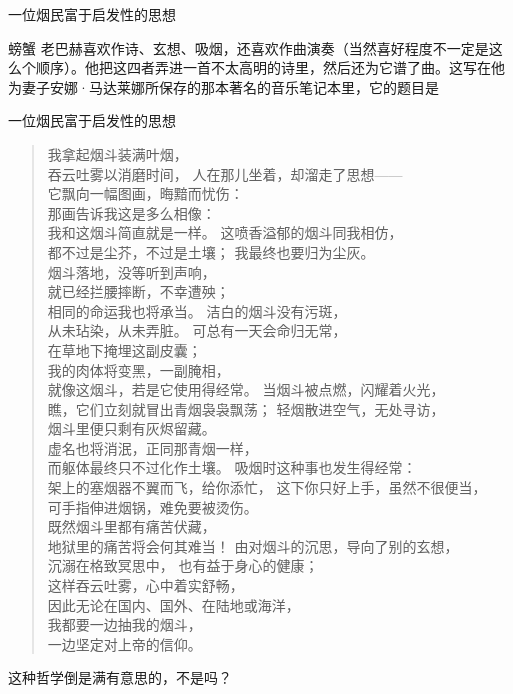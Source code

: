 \begin{dialog}{一位烟民富于启发性的思想}
\begin{dialogue}
\item[螃蟹]老巴赫喜欢作诗、玄想、吸烟，还喜欢作曲演奏（当然喜好程度不一定是这么个顺序）。他把这四者弄进一首不太高明的诗里，然后还为它谱了曲。这写在他为妻子安娜·马达莱娜所保存的那本著名的音乐笔记本里，它的题目是
\begin{center}\kaishu\large
一位烟民富于启发性的思想
\end{center}
\nopagebreak
\begin{verse}
我拿起烟斗装满叶烟，\\
吞云吐雾以消磨时间，
人在那儿坐着，却溜走了思想——\\
它飘向一幅图画，晦黯而忧伤：\\[1]
那画告诉我这是多么相像：\\[1]
我和这烟斗简直就是一样。
\medskip
这喷香溢郁的烟斗同我相仿，\\
都不过是尘芥，不过是土壤；
我最终也要归为尘灰。\\
烟斗落地，没等听到声响，\\[1]
就已经拦腰摔断，不幸遭殃；\\[1]
相同的命运我也将承当。
\medskip
洁白的烟斗没有污斑，\\
从未玷染，从未弄脏。
可总有一天会命归无常，\\
在草地下掩埋这副皮囊；\\[1]
我的肉体将变黑，一副腌相，\\[1]
就像这烟斗，若是它使用得经常。
\medskip
当烟斗被点燃，闪耀着火光，\\
瞧，它们立刻就冒出青烟袅袅飘荡；
轻烟散进空气，无处寻访，\\
烟斗里便只剩有灰烬留藏。\\[1]
虚名也将消泯，正同那青烟一样，\\[1]
而躯体最终只不过化作土壤。
\medskip
吸烟时这种事也发生得经常：\\
架上的塞烟器不翼而飞，给你添忙，
这下你只好上手，虽然不很便当，\\
可手指伸进烟锅，难免要被烫伤。\\[1]
既然烟斗里都有痛苦伏藏，\\[1]
地狱里的痛苦将会何其难当！
\medskip
由对烟斗的沉思，导向了别的玄想，\\
沉溺在格致冥思中，
也有益于身心的健康；\\
这样吞云吐雾，心中着实舒畅，\\[1]
因此无论在国内、国外、在陆地或海洋，\\[1]
我都要一边抽我的烟斗，\\[1]
一边坚定对上帝的信仰。
\end{verse}
这种哲学倒是满有意思的，不是吗？


\end{dialogue}
\end{dialog}
